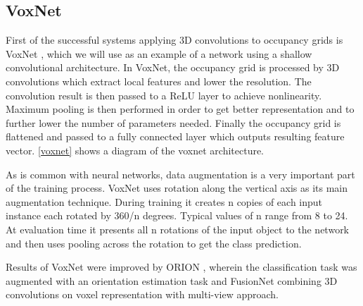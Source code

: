 \subsection{VoxNet}
First of the successful systems applying 3D convolutions to occupancy grids is VoxNet \cite{maturana_voxnet:_2015}, which we will use as an example of a network using a shallow convolutional architecture. 
In VoxNet, the occupancy grid is processed by 3D convolutions which extract local features and lower the resolution. The convolution result is then passed to a ReLU layer to achieve nonlinearity. Maximum pooling is then performed in order to get better representation and to further lower the number of parameters needed. Finally the occupancy grid is flattened and passed to a fully connected layer which outputs resulting feature vector. \autoref{voxnet} shows a diagram of the voxnet architecture.\par  
As is common with neural networks, data augmentation is a very important part of the training process. VoxNet uses rotation along the vertical axis as its main augmentation technique. During training it creates n copies of each input instance each rotated by 360/n degrees. Typical values of n range from 8 to 24. At evaluation time it presents all n rotations of the input object to the network and then uses pooling across the rotation to get the class prediction. \par
Results of VoxNet were improved by ORION \cite{sedaghat_orientation-boosted_2016}, wherein the classification task was augmented
with an orientation estimation task and FusionNet \cite{hegde_fusionnet:_2016} combining 3D convolutions on voxel representation with multi-view approach.



